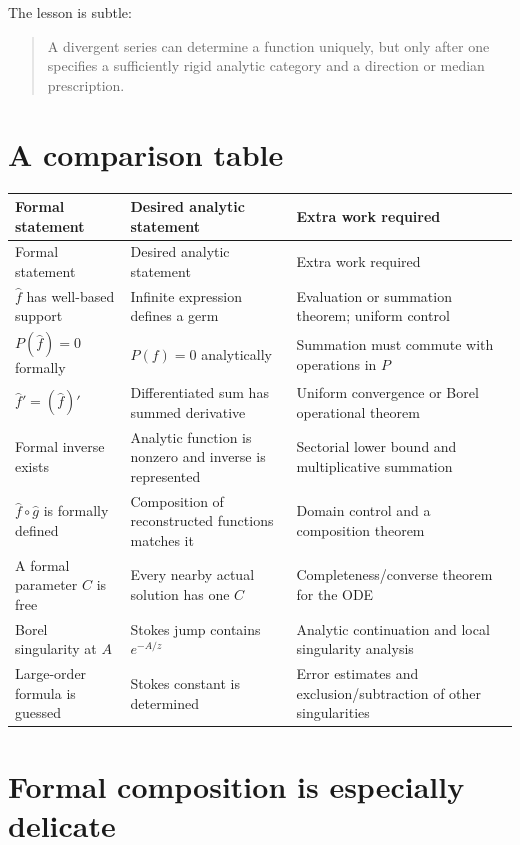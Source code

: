 \documentclass[11pt,openany]{book}
\theoremstyle{definition}
\theoremstyle{plain}
\theoremstyle{remark}
\newcommand{\trans}[1]{\widehat{#1}}
\begin{document}
The lesson is subtle:
\begin{quote}
A divergent series can determine a function uniquely, but only after one specifies a sufficiently rigid analytic category and a direction or median prescription.
\end{quote}

\section{A comparison table}

\begin{longtable}{>{\raggedright\arraybackslash}p{}
                  >{\raggedright\arraybackslash}p{}
                  >{\raggedright\arraybackslash}p{}}
\toprule
Formal statement & Desired analytic statement & Extra work required\\
\midrule
\endfirsthead
\toprule
Formal statement & Desired analytic statement & Extra work required\\
\midrule
\endhead
$\trans f$ has well-based support & Infinite expression defines a germ & Evaluation or summation theorem; uniform control\\
$P(\trans f)=0$ formally & $P(f)=0$ analytically & Summation must commute with operations in $P$\\
$\trans f'=(\trans f)'$ & Differentiated sum has summed derivative & Uniform convergence or Borel operational theorem\\
Formal inverse exists & Analytic function is nonzero and inverse is represented & Sectorial lower bound and multiplicative summation\\
$\trans f\circ\trans g$ is formally defined & Composition of reconstructed functions matches it & Domain control and a composition theorem\\
A formal parameter $C$ is free & Every nearby actual solution has one $C$ & Completeness/converse theorem for the ODE\\
Borel singularity at $A$ & Stokes jump contains $e^{-A/z}$ & Analytic continuation and local singularity analysis\\
Large-order formula is guessed & Stokes constant is determined & Error estimates and exclusion/subtraction of other singularities\\
\bottomrule
\end{longtable}

\section{Formal composition is especially delicate}
\end{document}
